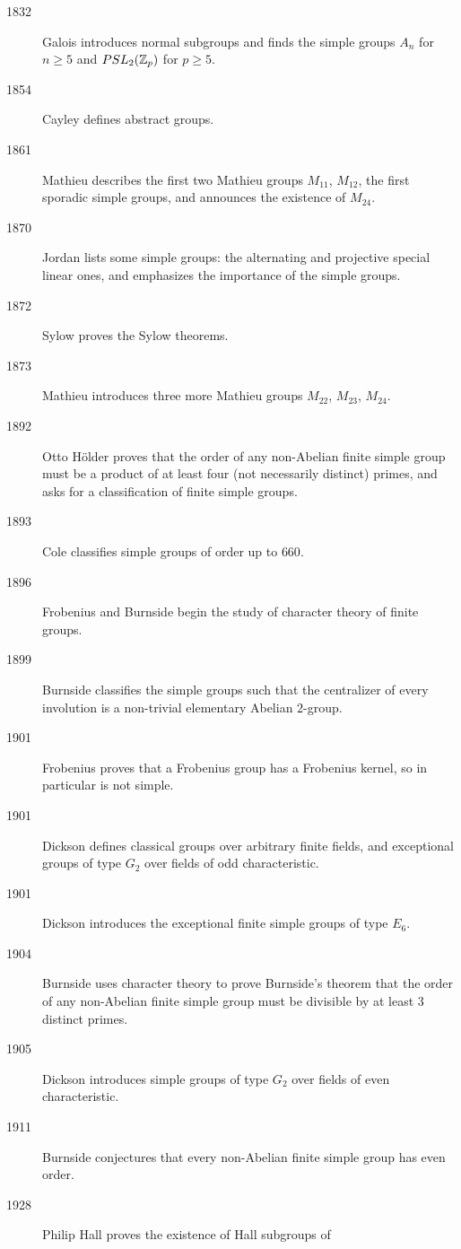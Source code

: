 \documentclass{ximera}
\begin{document}
\begin{description}
\item[1832] Galois introduces normal subgroups and finds the simple
  groups $A_n$ for $n\ge 5$ and $PSL_2(\mathbb Z_p)$ for $p\ge 5$.
\item[1854]	Cayley defines abstract groups.
\item[1861] Mathieu describes the first two Mathieu groups $M_{11}$,
  $M_{12}$, the first sporadic simple groups, and announces the
  existence of $M_{24}$.
\item[1870] Jordan lists some simple groups: the alternating and
  projective special linear ones, and emphasizes the importance of the
  simple groups.
\item[1872] Sylow proves the Sylow theorems.
\item[1873] Mathieu introduces three more Mathieu groups $M_{22}$,
  $M_{23}$, $M_{24}$.
\item[1892] Otto H\"older proves that the order of any non-Abelian
  finite simple group must be a product of at least four (not
  necessarily distinct) primes, and asks for a classification of
  finite simple groups.
\item[1893] Cole classifies simple groups of order up to $660$.
\item[1896]	Frobenius and Burnside begin the study of character theory of finite groups.
\item[1899] Burnside classifies the simple groups such that the
  centralizer of every involution is a non-trivial elementary Abelian
  $2$-group.
\item[1901] Frobenius proves that a Frobenius group has a Frobenius
  kernel, so in particular is not simple.
\item[1901] Dickson defines classical groups over arbitrary finite
  fields, and exceptional groups of type $G_2$ over fields of odd
  characteristic.
\item[1901] Dickson introduces the exceptional finite simple groups of
  type $E_6$.
\item[1904] Burnside uses character theory to prove Burnside's theorem
  that the order of any non-Abelian finite simple group must be
  divisible by at least $3$ distinct primes.
\item[1905] Dickson introduces simple groups of type $G_2$ over fields
  of even characteristic.
\item[1911] Burnside conjectures that every non-Abelian finite simple
  group has even order.
\item[1928] Philip Hall proves the existence of Hall subgroups of

\end{description}
\end{document}
